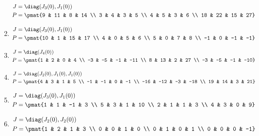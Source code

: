 \begin{enumerate}
\begin{align*}
J &= \diag(J_{3}(0), J_{1}(0))\\
P &= \pmat{9 & 11 & 8 & 14 \\ 3 & 4 & 3 & 5 \\ 4 & 5 & 3 & 6 \\ 18 & 22 & 15 & 27}
\end{align*}

\item

\begin{align*}
J &= \diag(J_{3}(0), J_{1}(0))\\
P &= \pmat{10 & 1 & 15 & 17 \\ 4 & 0 & 5 & 6 \\ 5 & 0 & 7 & 8 \\ -1 & 0 & -1 & -1}
\end{align*}

\item

\begin{align*}
J &= \diag(J_{4}(0))\\
P &= \pmat{1 & 2 & 0 & 4 \\ -3 & -5 & -1 & -11 \\ 8 & 13 & 2 & 27 \\ -3 & -5 & -1 & -10}
\end{align*}

\item

\begin{align*}
J &= \diag(J_{2}(0), J_{1}(0), J_{1}(0))\\
P &= \pmat{4 & 3 & 1 & 5 \\ -1 & -1 & 0 & -1 \\ -16 & -12 & -3 & -18 \\ 19 & 14 & 3 & 21}
\end{align*}

\item

\begin{align*}
J &= \diag(J_{3}(0), J_{1}(0))\\
P &= \pmat{1 & 1 & -1 & 3 \\ 5 & 3 & 1 & 10 \\ 2 & 1 & 1 & 3 \\ 4 & 3 & 0 & 9}
\end{align*}

\item

\begin{align*}
J &= \diag(J_{2}(0), J_{2}(0))\\
P &= \pmat{1 & 2 & 1 & 3 \\ 0 & 0 & 1 & 0 \\ 0 & 1 & 0 & 1 \\ 0 & 0 & 0 & -1}
\end{align*}


\end{enumerate}
